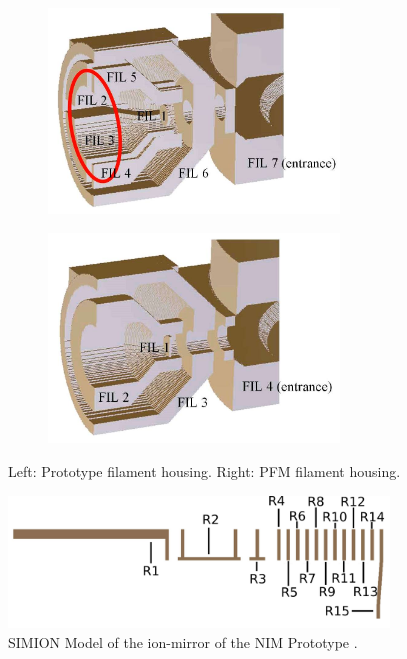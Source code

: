 	\begin{figure}[h] %
		\begin{subfigure}{0.5\textwidth}
			\centering
			\includegraphics[width =0.85\textwidth]{Setup/Proto_FilEl_sim.jpg}
		\end{subfigure}
		\begin{subfigure}{0.5\textwidth}
			\centering
			\includegraphics[width = 0.85\textwidth]{Setup/PFM_FilEl_sim.jpg}
		\end{subfigure}
		\caption{Left: Prototype filament housing. Right: PFM filament housing.}
		\label{fig:SetupFilElSim}
	\end{figure}
	\begin{figure}[h] %
		\centering
		\includegraphics[width=0.9\textwidth]{Setup/Prototype_Reflectron_sim.png}
		\caption{SIMION Model of the ion-mirror of the NIM Prototype \cite{Diss_Meyer}.}
		\label{fig:SetupProtoReflSim}
	\end{figure}
	
